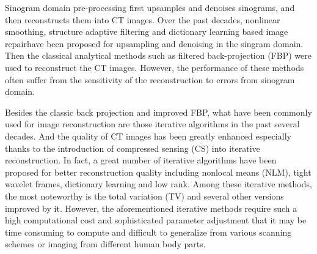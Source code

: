 \documentclass[lettersize,journal]{IEEEtran}
\begin{document}
Sinogram domain pre-processing first upsamples and denoises sinograms, and then reconstructs them into CT images. Over the past decades, nonlinear smoothing\cite{2004Nonlinear}, structure adaptive filtering\cite{2012Ray} and dictionary learning based image repair\cite{2014Dictionary}have been proposed for upsampling and denoising in the singram domain. Then the classical analytical methods such as filtered back-projection (FBP)\cite{kak2001principles} were used to reconstruct the CT images. However, the performance of these methods often suffer from the sensitivity of the reconstruction to errors from sinogram domain.

Besides the classic back projection and improved FBP, what have been commonly used for image reconstruction are those iterative algorithms in the past several decades. And the quality of CT images has been greatly enhanced especially thanks to the introduction of compressed sensing (CS)\cite{2006Robust, 2006Donoho} into iterative reconstruction. In fact, a great number of iterative algorithms have been proposed for better reconstruction quality including nonlocal means (NLM)\cite{2009Bayesian}, tight wavelet frames\cite{2011Multi}, dictionary learning\cite{2012Low, 2019Convolutional} and low rank\cite{2014Cine}. Among these iterative methods, the most noteworthy is the total variation (TV)\cite{2008Image} and several other versions improved by it\cite{2014Sparse, 2016Statistical, 2013Few}. However, the aforementioned iterative methods require such a high computational cost and sophisticated parameter adjustment that it may be time consuming to compute and difficult to generalize from various scanning schemes or imaging from different human body parts. 
\end{document}
